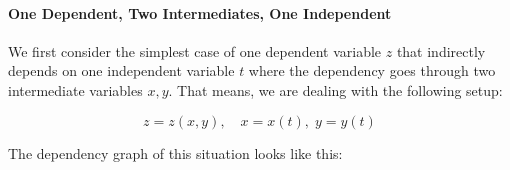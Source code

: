 \pgfplotsset{compat=1.12}




\paragraph{One Dependent, Two Intermediates, One Independent}
We first consider the simplest case of one dependent variable $z$ that indirectly depends on one independent variable $t$ where the dependency goes through two intermediate variables $x,y$. That means, we are dealing with the following setup:

\begin{equation}
z = z(x,y), \quad
x = x(t),   \;
y = y(t)
\end{equation}


The dependency graph of this situation looks like this:


